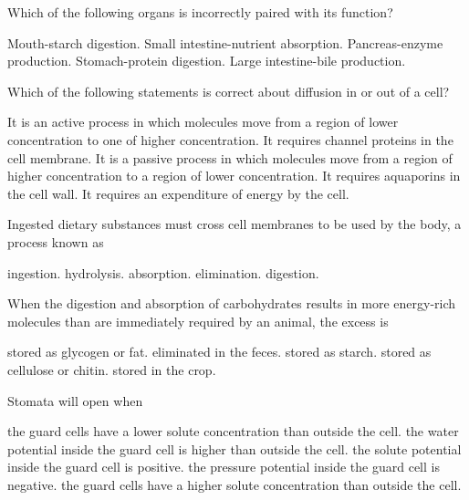 \newpage

\question
Which of the following organs is incorrectly paired with its function?

\begin{choices}
\choice Mouth-starch digestion. 
\choice Small intestine-nutrient absorption. 
\choice Pancreas-enzyme production. 
\choice Stomach-protein digestion. 
\correctchoice Large intestine-bile production. 
\end{choices}

\question
Which of the following statements is correct about diffusion in or out of a cell?

\begin{choices}
\choice It is an active process in which molecules move from a region of lower concentration to one of higher concentration. 
\choice It requires channel proteins in the cell membrane. 
\correctchoice It is a passive process in which molecules move from a region of higher concentration to a region of lower concentration. 
\choice It requires aquaporins in the cell wall. 
\choice It requires an expenditure of energy by the cell. 
\end{choices}

\question
Ingested dietary substances must cross cell membranes to be used by the body, a process known as

\begin{choices}
\choice ingestion. 
\choice hydrolysis. 
\correctchoice absorption. 
\choice elimination. 
\choice digestion. 
\end{choices}

\question
When the digestion and absorption of carbohydrates results in more energy-rich molecules than are immediately required by an animal, the excess is

\begin{choices}
\correctchoice stored as glycogen or fat. 
\choice eliminated in the feces. 
\choice stored as starch. 
\choice stored as cellulose or chitin. 
\choice stored in the crop. 
\end{choices}

\question
Stomata will open when  

\begin{choices}
\choice the guard cells have a lower solute concentration than outside the cell. 
\choice the water potential inside the guard cell is higher than outside the cell. 
\choice the solute potential inside the guard cell is positive. 
\choice the pressure potential inside the guard cell is negative. 
\correctchoice the guard cells have a higher solute concentration than outside the cell. 
\end{choices}

